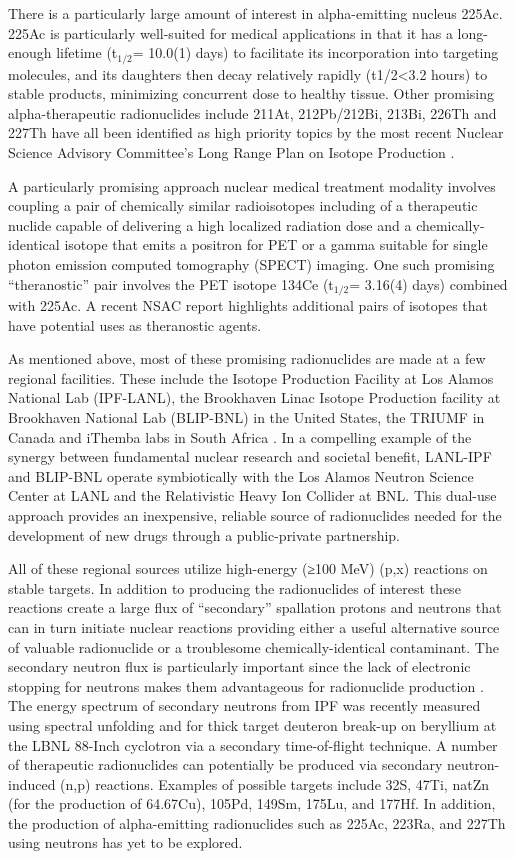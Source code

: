 \documentclass[letterpaper,draft]{ar-1col}
\begin{document}
There is a particularly large amount of interest in alpha-emitting nucleus 225Ac.  225Ac is particularly well-suited for medical applications in that it has a long-enough lifetime (t$_{1/2}$= 10.0(1) days) to facilitate its incorporation into targeting molecules, and its daughters then decay relatively rapidly (t1/2<3.2 hours) to stable products, minimizing concurrent dose to healthy tissue. Other promising alpha-therapeutic radionuclides include 211At, 212Pb/212Bi, 213Bi, 226Th and 227Th have all been identified as high priority topics by the most recent Nuclear Science Advisory Committee's Long Range Plan on Isotope Production \cite{Nsa15}.

A particularly promising approach nuclear medical treatment modality involves coupling a pair of chemically similar radioisotopes including of a therapeutic nuclide capable of delivering a high localized radiation dose and a chemically-identical isotope that emits a positron for PET or a gamma suitable for single photon emission computed tomography (SPECT) imaging. One such promising \enquote{theranostic} pair involves the PET isotope 134Ce (t$_{1/2}$= 3.16(4) days) combined with 225Ac.  A recent NSAC report \cite{Nsa15} highlights additional pairs of isotopes that have potential uses as theranostic agents. 

As mentioned above, most of these promising radionuclides are made at a few regional facilities.  These include the Isotope Production Facility at Los Alamos National Lab (IPF-LANL), the Brookhaven Linac Isotope Production facility at Brookhaven National Lab (BLIP-BNL) in the United States, the TRIUMF in Canada and iThemba labs in South Africa \cite{Iae675,Nsa15}.  In a compelling example of the synergy between fundamental nuclear research and societal benefit, LANL-IPF and BLIP-BNL operate symbiotically with the Los Alamos Neutron Science Center at LANL and the Relativistic Heavy Ion Collider at BNL.  This dual-use approach provides an inexpensive, reliable source of radionuclides needed for the development of new drugs through a public-private partnership. 

All of these regional sources utilize high-energy (≥100 MeV) (p,x) reactions on stable targets.  In addition to producing the radionuclides of interest these reactions create a large flux of \enquote{secondary} spallation protons and neutrons that can in turn initiate nuclear reactions providing either a useful alternative source of valuable radionuclide or a troublesome chemically-identical contaminant.  The secondary neutron flux is particularly important since the lack of electronic stopping for neutrons makes them advantageous for radionuclide production \cite{Voy18a}.  The energy spectrum of secondary neutrons from IPF was recently measured using spectral unfolding \cite{Mos16} and for thick target deuteron break-up on beryllium at the LBNL 88-Inch cyclotron \cite{Har18} via a secondary time-of-flight technique. A number of therapeutic radionuclides can potentially be produced via secondary neutron-induced (n,p) reactions. Examples of possible targets include 32S, 47Ti, natZn (for the production of 64.67Cu), 105Pd, 149Sm, 175Lu, and 177Hf.  In addition, the production of alpha-emitting radionuclides such as 225Ac, 223Ra, and 227Th using neutrons has yet to be explored.
\end{document}
